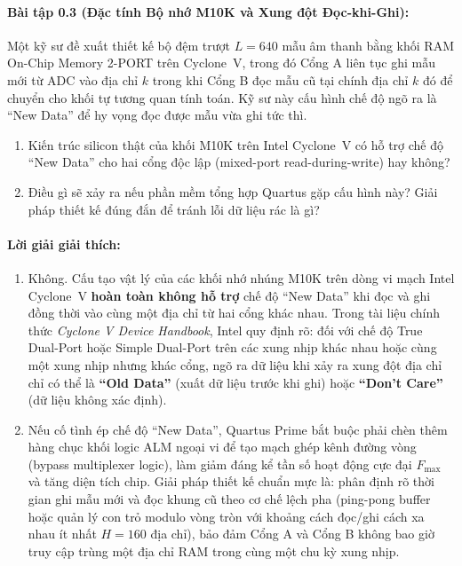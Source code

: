 \paragraph{Bài tập 0.3 (Đặc tính Bộ nhớ M10K và Xung đột Đọc-khi-Ghi):} Một kỹ sư đề xuất thiết kế bộ đệm trượt $L = 640$ mẫu âm thanh bằng khối RAM On-Chip Memory 2-PORT trên Cyclone~V, trong đó Cổng A liên tục ghi mẫu mới từ ADC vào địa chỉ $k$ trong khi Cổng B đọc mẫu cũ tại chính địa chỉ $k$ đó để chuyển cho khối tự tương quan tính toán. Kỹ sư này cấu hình chế độ ngõ ra là ``New Data'' để hy vọng đọc được mẫu vừa ghi tức thì.
\begin{enumerate}[label=\alph*)]
    \item Kiến trúc silicon thật của khối M10K trên Intel Cyclone~V có hỗ trợ chế độ ``New Data'' cho hai cổng độc lập (mixed-port read-during-write) hay không?
    \item Điều gì sẽ xảy ra nếu phần mềm tổng hợp Quartus gặp cấu hình này? Giải pháp thiết kế đúng đắn để tránh lỗi dữ liệu rác là gì?
\end{enumerate}

\paragraph{Lời giải giải thích:}
\begin{enumerate}[label=\alph*)]
    \item Không. Cấu tạo vật lý của các khối nhớ nhúng M10K trên dòng vi mạch Intel Cyclone~V \textbf{hoàn toàn không hỗ trợ} chế độ ``New Data'' khi đọc và ghi đồng thời vào cùng một địa chỉ từ hai cổng khác nhau. Trong tài liệu chính thức \emph{Cyclone V Device Handbook}, Intel quy định rõ: đối với chế độ True Dual-Port hoặc Simple Dual-Port trên các xung nhịp khác nhau hoặc cùng một xung nhịp nhưng khác cổng, ngõ ra dữ liệu khi xảy ra xung đột địa chỉ chỉ có thể là \textbf{``Old Data''} (xuất dữ liệu trước khi ghi) hoặc \textbf{``Don't Care''} (dữ liệu không xác định).
    \item Nếu cố tình ép chế độ ``New Data'', Quartus Prime bắt buộc phải chèn thêm hàng chục khối logic ALM ngoại vi để tạo mạch ghép kênh đường vòng (bypass multiplexer logic), làm giảm đáng kể tần số hoạt động cực đại $F_{\max}$ và tăng diện tích chip. Giải pháp thiết kế chuẩn mực là: phân định rõ thời gian ghi mẫu mới và đọc khung cũ theo cơ chế lệch pha (ping-pong buffer hoặc quản lý con trỏ modulo vòng tròn với khoảng cách đọc/ghi cách xa nhau ít nhất $H = 160$ địa chỉ), bảo đảm Cổng A và Cổng B không bao giờ truy cập trùng một địa chỉ RAM trong cùng một chu kỳ xung nhịp.
\end{enumerate}

